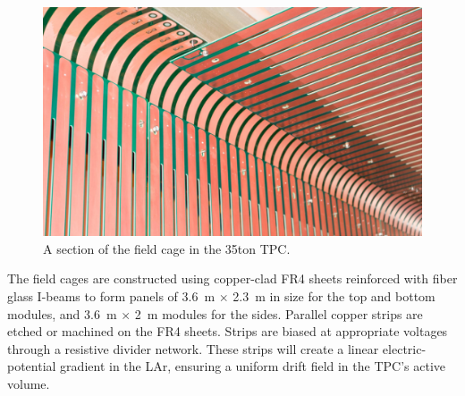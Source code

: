 



\begin{figure}[htb]
\centering
\includegraphics[width=.49\textwidth]{figures/TPC_FCA_1}
\caption{A section of the field cage in the 35ton TPC.}
\label{fig:tpc_fca_1}
\end{figure}    

   

The field cages are constructed using copper-clad FR4 sheets reinforced with fiber glass I-beams to form panels of 3.6~m $\times$ 2.3~m in size for the top and bottom modules, and 3.6~m $\times$ 2~m modules for the sides.  Parallel copper strips are etched or machined on the FR4 sheets.  Strips are biased at appropriate voltages through a resistive divider network. These strips will create a linear electric-potential gradient in the LAr, ensuring a uniform drift field in the TPC's active volume. 
 

